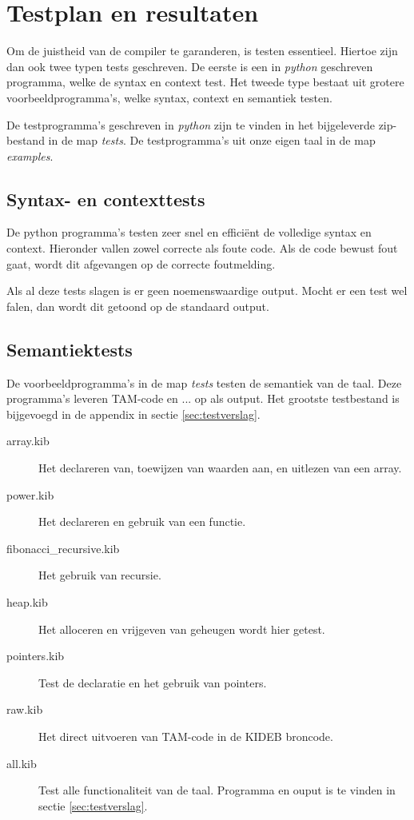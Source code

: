 \chapter{Testplan en resultaten} %
\label{cha:testplan_en_resultaten}
Om de juistheid van de compiler te garanderen, is testen essentieel. Hiertoe zijn dan ook twee typen tests geschreven. De eerste is een in \emph{python} geschreven programma, welke de syntax en context test. Het tweede type bestaat uit grotere voorbeeldprogramma's, welke syntax, context en semantiek testen.

De testprogramma's geschreven in \emph{python} zijn te vinden in het bijgeleverde zip-bestand in de map \emph{tests}. De testprogramma's uit onze eigen taal in de map \emph{examples}.

\section{Syntax- en contexttests} %
\label{sec:syntax_en_context}
De python programma's testen zeer snel en effici\"ent de volledige syntax en context. Hieronder vallen zowel correcte als foute code. Als de code bewust fout gaat, wordt dit afgevangen op de correcte foutmelding. 

Als al deze tests slagen is er geen noemenswaardige output. Mocht er een test wel falen, dan wordt dit getoond op de standaard output. 


\section{Semantiektests} %
\label{sec:semantiektests}

De voorbeeldprogramma's in de map \emph{tests} testen de semantiek van de taal. Deze programma's leveren TAM-code en ... op als output. Het grootste testbestand is bijgevoegd in de appendix in sectie \ref{sec:testverslag}.

\begin{description}
    \item[array.kib] Het declareren van, toewijzen van waarden aan, en uitlezen van een array.
    \item[power.kib] Het declareren en gebruik van een functie.
    \item[fibonacci\_recursive.kib] Het gebruik van recursie.
    \item[heap.kib] Het alloceren en vrijgeven van geheugen wordt hier getest. 
    \item[pointers.kib] Test de declaratie en het gebruik van pointers.
    \item[raw.kib] Het direct uitvoeren van TAM-code in de KIDEB broncode.
    \item[all.kib] Test alle functionaliteit van de taal. Programma en ouput is te vinden in sectie \ref{sec:testverslag}.
\end{description}

\clearpage